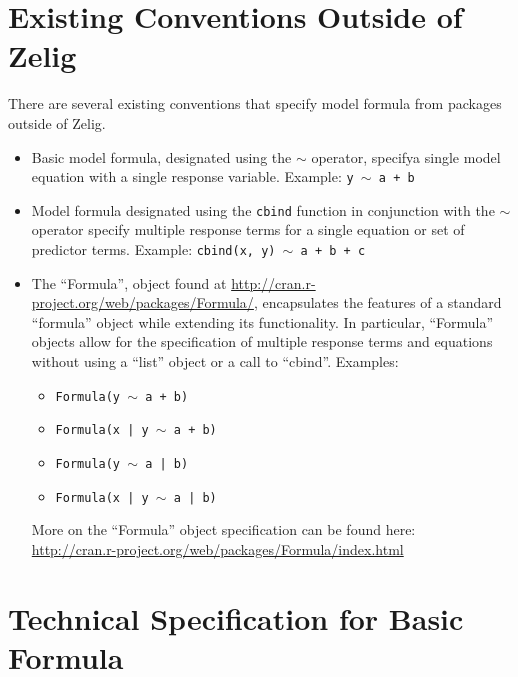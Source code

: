 \documentclass{article}
\newcommand{\tweedly}[0]{$\sim${ }}
\begin{document}
%
%
%
\section{Existing Conventions Outside of Zelig}
\label{sec:existing-elsewhere}

There are several existing conventions that specify model formula from packages
outside of Zelig.

\begin{itemize}

  \item Basic model formula, designated using the \tweedly operator, specifya single
    model equation with a single response variable. Example: 
    {\tt y \tweedly a + b}

  \item Model formula designated using the \verb+cbind+ function in conjunction
    with the \tweedly operator specify multiple response terms for a single
    equation or set of predictor terms. Example: 
    {\tt cbind(x, y) \tweedly a + b + c}

  \item The ``Formula'', object found at
    \url{http://cran.r-project.org/web/packages/Formula/}, encapsulates the
    features of a standard ``formula'' object while extending its functionality.
    In particular, ``Formula'' objects allow for the specification of multiple
    response terms and equations without using a ``list'' object or a call to
    ``cbind''. Examples:
    \begin{itemize}
      \item {\tt Formula(y \tweedly a + b)}
      \item {\tt Formula(x | y \tweedly a + b)}
      \item {\tt Formula(y \tweedly a | b)}
      \item {\tt Formula(x | y \tweedly a | b)}
   \end{itemize}

   More on the ``Formula'' object specification can be found here:\\
   \url{http://cran.r-project.org/web/packages/Formula/index.html}

\end{itemize}



%
%
%
\section{Technical Specification for Basic Formula}
\end{document}
